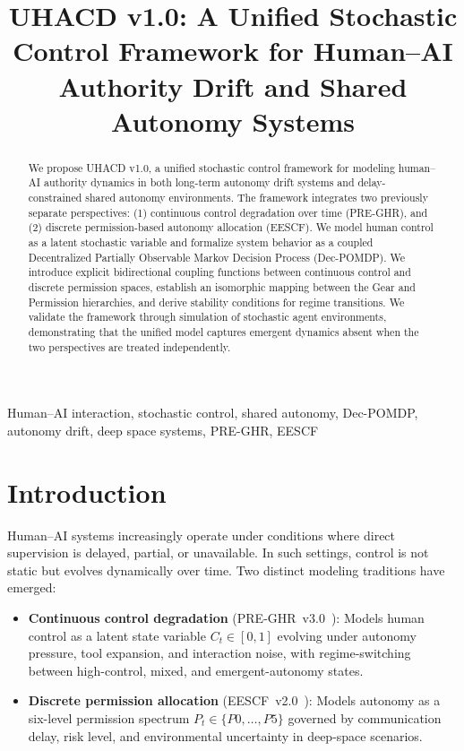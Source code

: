 \documentclass[conference]{IEEEtran}
\title{UHACD v1.0: A Unified Stochastic Control Framework for Human--AI Authority Drift and Shared Autonomy Systems}
\author{
\IEEEauthorblockN{Anonymous Author}
\IEEEauthorblockA{
Independent Research \\
Human--AI Control Systems Group \\
Email: anonymous@research.org
}
}
\begin{document}
\maketitle

\begin{abstract}
We propose UHACD v1.0, a unified stochastic control framework for modeling human--AI authority dynamics in both long-term autonomy drift systems and delay-constrained shared autonomy environments. The framework integrates two previously separate perspectives: (1) continuous control degradation over time (PRE-GHR), and (2) discrete permission-based autonomy allocation (EESCF). We model human control as a latent stochastic variable and formalize system behavior as a coupled Decentralized Partially Observable Markov Decision Process (Dec-POMDP). We introduce explicit bidirectional coupling functions between continuous control and discrete permission spaces, establish an isomorphic mapping between the Gear and Permission hierarchies, and derive stability conditions for regime transitions. We validate the framework through simulation of stochastic agent environments, demonstrating that the unified model captures emergent dynamics absent when the two perspectives are treated independently.
\end{abstract}

\begin{IEEEkeywords}
Human--AI interaction, stochastic control, shared autonomy, Dec-POMDP, autonomy drift, deep space systems, PRE-GHR, EESCF
\end{IEEEkeywords}

\section{Introduction}

Human--AI systems increasingly operate under conditions where direct supervision is delayed, partial, or unavailable. In such settings, control is not static but evolves dynamically over time. Two distinct modeling traditions have emerged:

\begin{itemize}
\item \textbf{Continuous control degradation} (PRE-GHR~v3.0~\cite{preghr2026}): Models human control as a latent state variable $C_t \in [0,1]$ evolving under autonomy pressure, tool expansion, and interaction noise, with regime-switching between high-control, mixed, and emergent-autonomy states.
\item \textbf{Discrete permission allocation} (EESCF~v2.0~\cite{eescf2026}): Models autonomy as a six-level permission spectrum $P_t \in \{P0,\dots,P5\}$ governed by communication delay, risk level, and environmental uncertainty in deep-space scenarios.
\end{itemize}
\end{document}
